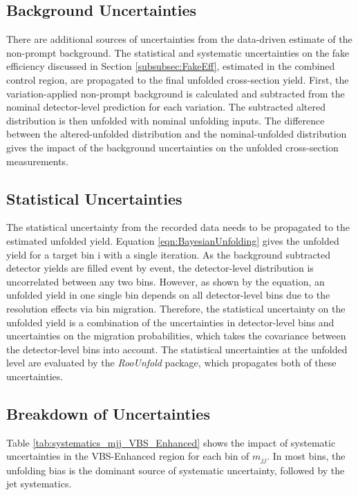 \begin{itemize}
{    }
\end{itemize}

\subsection{Background Uncertainties}
\label{subsec:BkgUnc}
There are additional sources of uncertainties from the data-driven estimate of the non-prompt background. The statistical and systematic uncertainties on the fake efficiency discussed in Section \ref{subsubsec:FakeEff}, estimated in the combined control region, are propagated to the final unfolded cross-section yield. First, the variation-applied non-prompt background is calculated and subtracted from the nominal detector-level prediction for each variation. The subtracted altered distribution is then unfolded with nominal unfolding inputs. The difference between the altered-unfolded distribution and the nominal-unfolded distribution gives the impact of the background uncertainties on the unfolded cross-section measurements.

\subsection{Statistical Uncertainties}
\label{subsubsec:StatUnc}
The statistical uncertainty from the recorded data needs to be propagated to the estimated unfolded yield. Equation \ref{eqn:BayesianUnfolding} gives the unfolded yield for a target bin i with a single iteration. As the background subtracted detector yields are filled event by event, the detector-level distribution is uncorrelated between any two bins. However, as shown by the equation, an unfolded yield in one single bin depends on all detector-level bins due to the resolution effects via bin migration. Therefore, the statistical uncertainty on the unfolded yield is a combination of the uncertainties in detector-level bins and uncertainties on the migration probabilities, which takes the covariance between the detector-level bins into account. The statistical uncertainties at the unfolded level are evaluated by the \textit{RooUnfold} package, which propagates both of these uncertainties.

\subsection{Breakdown of Uncertainties }
\label{subsec:SysUncBreakdown}
Table \ref{tab:systematics_mjj_VBS_Enhanced} shows the impact of systematic uncertainties in the VBS-Enhanced region for each bin of $m_{jj}$. In most bins, the unfolding bias is the dominant source of systematic uncertainty, followed by the jet systematics. 

